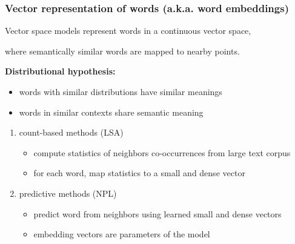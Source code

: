 \documentclass{beamer}   %
\begin{document}

\begin{frame}[t]
\frametitle{Vector representation of words (a.k.a. word embeddings)}
    Vector space models represent words in a continuous vector space, \par
    where semantically similar words are mapped to nearby points. \par
    \vspace{0.5em}
    \textbf{Distributional hypothesis:} \par
    \begin{itemize}
        \item words with similar distributions have similar meanings
        \item words in similar contexts share semantic meaning
    \end{itemize}
    \parbox[][][c]{7.5cm}{%
        \begin{enumerate}
            \item count-based methods (LSA)
            \begin{itemize}
                \item compute statistics of neighbors co-occurrences from large text corpus
                \item for each word, map statistics to a small and dense vector
            \end{itemize}
            \item predictive methods (NPL)
            \begin{itemize}
                \item predict word from neighbors using learned small and dense vectors
                \item embedding vectors are parameters of the model
            \end{itemize}
        \end{enumerate}
    }
    \parbox[][4.5cm][t]{3cm}{%
    }
    \par
\end{frame}
\end{document}
